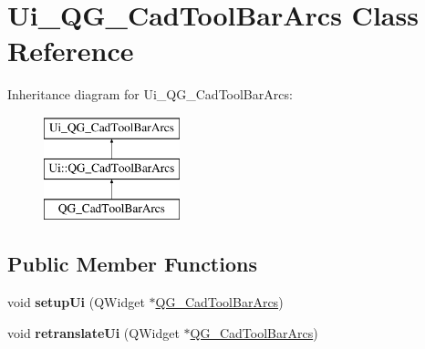 \hypertarget{classUi__QG__CadToolBarArcs}{\section{Ui\-\_\-\-Q\-G\-\_\-\-Cad\-Tool\-Bar\-Arcs Class Reference}
\label{classUi__QG__CadToolBarArcs}
}
Inheritance diagram for Ui\-\_\-\-Q\-G\-\_\-\-Cad\-Tool\-Bar\-Arcs\-:\begin{figure}[H]
\begin{center}
\leavevmode
\includegraphics[height=3.000000cm]{classUi__QG__CadToolBarArcs}
\end{center}
\end{figure}
\subsection*{Public Member Functions}
\begin{DoxyCompactItemize}
\item 
\hypertarget{classUi__QG__CadToolBarArcs_af558454bec5ff6ea15b64fa418d0bc44}{void {\bfseries setup\-Ui} (Q\-Widget $\ast$\hyperlink{classQG__CadToolBarArcs}{Q\-G\-\_\-\-Cad\-Tool\-Bar\-Arcs})}\label{classUi__QG__CadToolBarArcs_af558454bec5ff6ea15b64fa418d0bc44}

\item 
\hypertarget{classUi__QG__CadToolBarArcs_a93a5ac6cf17a55ea73f5807bf8501786}{void {\bfseries retranslate\-Ui} (Q\-Widget $\ast$\hyperlink{classQG__CadToolBarArcs}{Q\-G\-\_\-\-Cad\-Tool\-Bar\-Arcs})}\label{classUi__QG__CadToolBarArcs_a93a5ac6cf17a55ea73f5807bf8501786}

\end{DoxyCompactItemize}
